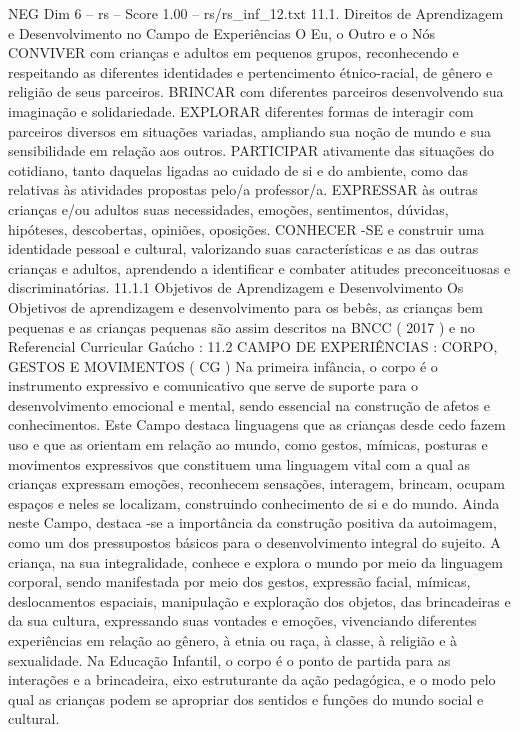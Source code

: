 \begin{textsample}{NEG Dim 6 – rs – Score 1.00 – rs/rs\_inf\_12.txt}  \label{ex:f6_neg_110}
11.1.
Direitos de Aprendizagem e Desenvolvimento no Campo de Experiências O Eu, o Outro e o Nós CONVIVER com crianças e adultos em pequenos grupos, reconhecendo e respeitando as diferentes identidades e pertencimento étnico-racial, de gênero e religião de seus parceiros.
BRINCAR com diferentes parceiros desenvolvendo sua imaginação e solidariedade.
EXPLORAR diferentes formas de interagir com parceiros diversos em situações variadas, ampliando sua noção de mundo e sua sensibilidade em relação aos outros.
PARTICIPAR ativamente das situações do cotidiano, tanto daquelas ligadas ao cuidado de si e do ambiente, como das relativas às atividades propostas pelo/a professor/a.
EXPRESSAR às outras crianças e/ou adultos suas necessidades, emoções, sentimentos, dúvidas, hipóteses, descobertas, opiniões, oposições.
CONHECER -SE e construir uma identidade pessoal e cultural, valorizando suas características e as das outras crianças e adultos, aprendendo a identificar e combater atitudes preconceituosas e discriminatórias. 11.1.1 Objetivos de Aprendizagem e Desenvolvimento Os Objetivos de aprendizagem e desenvolvimento para os bebês, as crianças bem pequenas e as crianças pequenas são assim descritos na BNCC ( 2017 ) e no Referencial Curricular Gaúcho : 11.2 CAMPO DE EXPERIÊNCIAS : CORPO, GESTOS E MOVIMENTOS ( CG ) Na primeira infância, o corpo é o instrumento expressivo e comunicativo que serve de suporte para o desenvolvimento emocional e mental, sendo essencial na construção de afetos e conhecimentos.
Este Campo destaca linguagens que as crianças desde cedo fazem uso e que as orientam em relação ao mundo, como gestos, mímicas, posturas e movimentos expressivos que constituem uma linguagem vital com a qual as crianças expressam emoções, reconhecem sensações, interagem, brincam, ocupam espaços e neles se localizam, construindo conhecimento de si e do mundo.
Ainda neste Campo, destaca -se a importância da construção positiva da autoimagem, como um dos pressupostos básicos para o desenvolvimento integral do sujeito.
A criança, na sua integralidade, conhece e explora o mundo por meio da linguagem corporal, sendo manifestada por meio dos gestos, expressão facial, mímicas, deslocamentos espaciais, manipulação e exploração dos objetos, das brincadeiras e da sua cultura, expressando suas vontades e emoções, vivenciando diferentes experiências em relação ao gênero, à etnia ou raça, à classe, à religião e à sexualidade.
Na Educação Infantil, o corpo é o ponto de partida para as interações e a brincadeira, eixo estruturante da ação pedagógica, e o modo pelo qual as crianças podem se apropriar dos sentidos e funções do mundo social e cultural.

\end{textsample}
